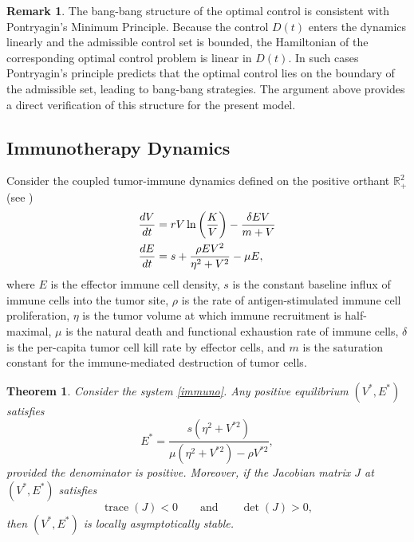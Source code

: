\documentclass[11pt, reqno]{amsart}
\numberwithin{equation}{section}
\newtheorem{theorem}{Theorem}[section]
\theoremstyle{definition}
\newtheorem{remark}[definition]{Remark}
\begin{document}
\begin{remark}
The bang-bang structure of the optimal control is consistent with Pontryagin's Minimum Principle. Because the control $D(t)$ enters the dynamics linearly and the admissible control set is bounded, the Hamiltonian of the corresponding optimal control problem is linear in $D(t)$. In such cases Pontryagin's principle predicts that the optimal control lies on the boundary of the admissible set, leading to bang-bang strategies. The argument above provides a direct verification of this structure for the present model.
\end{remark}





\subsection{Immunotherapy Dynamics}
Consider the coupled tumor-immune dynamics defined on the positive orthant $\mathbb{R}^2_+$ (see \cite{Kuznetsov1994})
\begin{align}\label{immuno}
\frac{dV}{dt} &= r V \ln\left(\frac{K}{V}\right) - \frac{\delta E V}{m + V} \\
\frac{dE}{dt} &= s + \frac{\rho E V^2}{\eta^2 + V^2} - \mu E, \notag 
\end{align}
where $E$ is the effector immune cell density, $s$ is the constant baseline influx of immune cells into the tumor site, $\rho$ is the rate of antigen-stimulated immune cell proliferation, $\eta$ is the tumor volume at which immune recruitment is half-maximal, $\mu$ is the natural death and functional exhaustion rate of immune cells, $\delta$ is the per-capita tumor cell kill rate by effector cells, and $m$ is the saturation constant for the immune-mediated destruction of tumor cells.

\begin{theorem}
\label{thm:immuno}
Consider the system \eqref{immuno}. Any positive equilibrium
$(V^*,E^*)$ satisfies
\[
E^*=\frac{s(\eta^2+V^{*2})}{\mu(\eta^2+V^{*2})-\rho V^{*2}},
\]
provided the denominator is positive. Moreover, if the Jacobian matrix
$J$ at $(V^*,E^*)$ satisfies
\[
\operatorname{trace}(J)<0
\qquad\text{and}\qquad
\det(J)>0,
\]
then $(V^*,E^*)$ is locally asymptotically stable.
\end{theorem}
\end{document}
